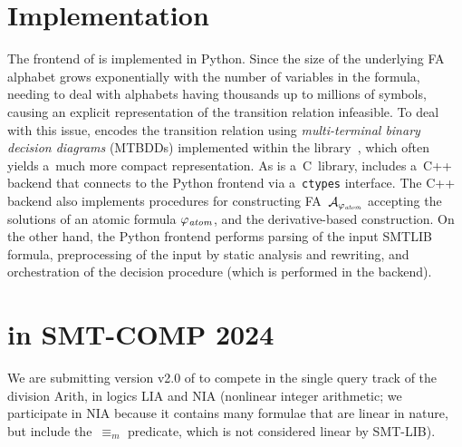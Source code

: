 \documentclass[acmsmall,screen,nonacm=true]{acmart}
\begin{document}
\vspace{-0.0mm}
\section{Implementation}\label{sec:label}
\vspace{-0.0mm}

The frontend of \amaya is implemented in Python.
Since the size of the underlying FA alphabet grows exponentially with the
number of variables in the formula, needing to deal with alphabets having
thousands up to millions of symbols, causing an explicit representation of the
transition relation infeasible.
To deal with this issue, \amaya encodes the transition relation using
\emph{multi-terminal binary decision diagrams} (MTBDDs) implemented within the
\sylvan library~\cite{DijkP15}, which often yields a~much more compact representation.
As \sylvan is a~C~library, \amaya includes a~C++ backend that connects to the
Python frontend via a~\texttt{ctypes} interface. The C++ backend also implements
procedures for constructing FA~$\mathcal{A}_{\varphi_{\mathit{atom}}}$ accepting the solutions
of an atomic formula $\varphi_{\mathit{atom}}$, and the derivative-based
construction.
On the other hand, the Python frontend performs parsing of the input SMTLIB
formula, preprocessing of the input by static analysis and rewriting, and
orchestration of the decision procedure (which is performed in the backend).




\vspace{-0.0mm}
\section{\amaya in SMT-COMP 2024}\label{sec:label}
\vspace{-0.0mm}


We are submitting version v2.0 of \amaya to compete in the single query track
of the division Arith, in logics LIA and NIA (nonlinear integer arithmetic; we
participate in NIA because it contains many formulae that are linear in nature, but
include the~$\equiv_m$ predicate, which is not considered linear by SMT-LIB).








\end{document}
